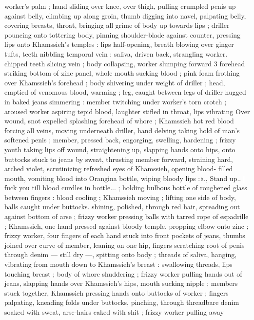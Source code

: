 worker's palm ; hand sliding over knee, over thigh, pulling crumpled
penis up against belly, climbing up along groin, thumb digging into
navel, palpating belly, covering breasts, throat, bringing all grime of
body up towards lips ; driller pouncing onto tottering body, pinning
shoulder-blade against counter, pressing lips onto Khamssieh’s
temples : lips half-opening, breath blowing over ginger tufts, teeth
nibbling temporal vein : saliva, driven back, strangling worker.
chipped teeth slicing vein ; body collapsing, worker slumping forward
3 forehead striking bottom of zinc panel, whole mouth sucking blood
; pink foam frothing over Khamssieh’s forehead ; body shivering
under weight of driller ; head, emptied of venomous blood, warming
; leg, caught between legs of driller hugged in baked jeans
simmering : member twitching under worker's torn crotch ; aroused
worker aspiring tepid blood, laughter stifled in throat, lips vibrating
Over wound, snot expelled splashing forehead of whore ; Khamssieh
hot red blood forcing all veins, moving underneath driller, hand
delving taking hold of man's softened penis ; member, pressed back,
engorging, swelling, hardening ; frizzy youth taking lips off wound,
straightening up, slapping hands onto hips, onto buttocks stuck to
jeans by sweat, thrusting member forward, straining hard, arched
violet, scrutinizing refreshed eyes of Khamssieh, opening blood-
filled mouth, vomiting blood into Orangina bottle, wiping bloody lips
:«., Stand up.. | fuck you till blood curdles in bottle... ; holding
bulbous bottle of roughened glass between fingers : blood cooling ;
Khamssieh moving ; lifting one side of body, balls caught under
buttocks. shining, polished, through red hair, spreading out against
bottom of arse ; frizzy worker pressing balls with tarred rope of
espadrille ; Khamssieh, one hand pressed against bloody temple,
propping elbow onto zinc ; frizzy worker, four fingers of each hand
stuck into front pockets of jeans, thumbs joined over curve of
member, leaning on one hip, fingers scratching root of penis through
denim --- still dry ---, spitting onto body ; threads of saliva, hanging,
vibrating from mouth down to Khamssieh's breast : swallowing
threads, lips touching breast ; body of whore shuddering ; frizzy
worker pulling hands out of jeans, slapping hands over Khamssieh's
hips, mouth sucking nipple ; members stuck together, Khamssieh
pressing hands onto buttocks of worker ; fingers palpating, kneading
folds under buttocks, pinching, through threadbare denim soaked
with sweat, arse-hairs caked with shit ; frizzy worker pulling away

